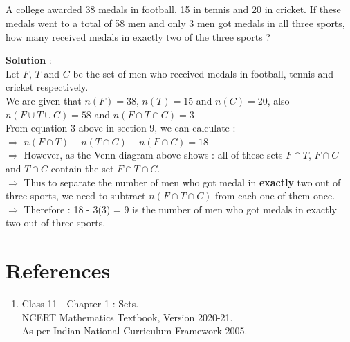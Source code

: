\documentclass[12pt, letterpaper]{article}
\begin{document}
\subsection{}
A college awarded 38 medals in football, 15 in tennis and 20 in cricket. If these medals went to a total of 58 men and only 3 men got medals in all three sports, how many received medals in exactly two of the three sports ?
\begin{center}
\end{center}
\textbf{Solution} : \\
Let $F$, $T$ and $C$ be the set of men who received medals in football, tennis and cricket respectively.\\
We are given that $n(F) = 38$, $n(T) = 15$ and $n(C) = 20$, also $n(F \cup T \cup C) = 58$ and $n(F \cap T \cap C) = 3$ \\
From equation-3 above in section-9, we can calculate : \\
$\Rightarrow$ $n(F \cap T) + n(T \cap C) + n(F \cap C) = 18$ \\
$\Rightarrow$ However, as the Venn diagram above shows : all of these sets $F \cap T$, $F \cap C$ and $T \cap C$ contain the set $F \cap T \cap C$.\\ 
$\Rightarrow$ Thus to separate the number of men who got medal in \textbf{exactly} two out of three sports, we need to subtract $n(F \cap T \cap C)$ from each one of them once.\\
$\Rightarrow$ Therefore : 18 - 3(3) = 9 is the number of men who got medals in exactly two out of three sports.

\section{References}
\begin{enumerate}
    \item Class 11 - Chapter 1 : Sets.\\ 
    NCERT Mathematics Textbook, Version 2020-21.\\
    As per Indian National Curriculum Framework 2005.
\end{enumerate}
\end{document}
